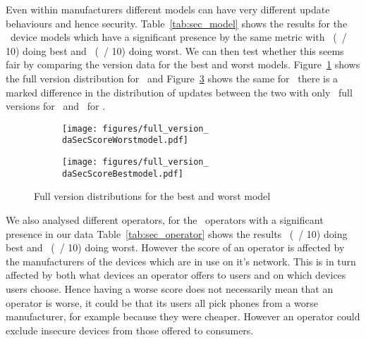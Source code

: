 \daTabSecScoresmodel
Even within manufacturers different models can have very different update behaviours and hence security.
Table~\ref{tab:sec_model} shows the results for the \daNumSigModels\ device models which have a significant presence by the same metric with \daSecScoreBestmodel\ (\daSecScoreBestmodelScore\ / 10) doing best and \daSecScoreWorstmodel\ (\daSecScoreWorstmodelScore\ / 10) doing worst.
We can then test whether this seems fair by comparing the version data for the best and worst models.
Figure~\ref{fig:worst_model_full} shows the full version distribution for \daSecScoreWorstmodel\ and Figure~\ref{fig:best_model_full} shows the same for \daSecScoreBestmodel\ there is a marked difference in the distribution of updates between the two with only \daSecScoreWorstmodelNumFullVersions\ full versions for \daSecScoreWorstmodel\ and \daSecScoreBestmodelNumFullVersions\ for \daSecScoreBestmodel.

\begin{figure}
 \centering
 \begin{subfigure}[b]{\columnwidth}
 \texttt{[image: figures/full\_version\_\\daSecScoreWorstmodel.pdf]}
 \caption{\daSecScoreWorstmodel}
 \label{fig:worst_model_full}
\end{subfigure}
\begin{subfigure}[b]{\columnwidth}
 \texttt{[image: figures/full\_version\_\\daSecScoreBestmodel.pdf]}
 \caption{\daSecScoreBestmodel}
 \label{fig:best_model_full}
\end{subfigure}
\caption{Full version distributions for the best and worst model}
\end{figure}

\daTabSecScoresoperator
We also analysed different operators, for the \daNumSigOperators\ operators with a significant presence in our data Table~\ref{tab:sec_operator} shows the results \daSecScoreBestoperator\ (\daSecScoreBestoperatorScore\ / 10) doing best and \daSecScoreWorstoperator\ (\daSecScoreWorstoperatorScore\ / 10) doing worst.
However the score of an operator is affected by the manufacturers of the devices which are in use on it's network.
This is in turn affected by both what devices an operator offers to users and on which devices users choose.
Hence having a worse score does not necessarily mean that an operator is worse, it could be that its users all pick phones from a worse manufacturer, for example because they were cheaper.
However an operator could exclude insecure devices from those offered to consumers.

